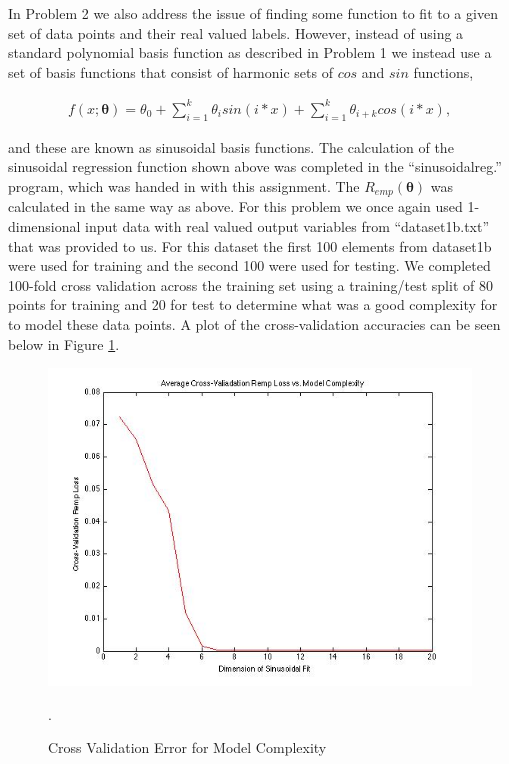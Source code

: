 \documentclass[paper=a4, fontsize=11pt]{scrartcl} %
\begin{document}
In Problem 2 we also address the issue of finding some function to fit to a given set of data points and their real valued labels.  However, instead of using a standard polynomial basis function as described in Problem 1 we instead use a set of basis functions that consist of harmonic sets of $cos$ and $sin$ functions, 

\begin{align}
f(x;\bm{\theta}) = \theta_{0} +\sum\limits_{i=1}^k \theta_{i}sin(i*x) + \sum\limits_{i=1}^k \theta_{i+k}cos(i*x),
\end{align}

and these are known as sinusoidal basis functions.
The calculation of the sinusoidal regression function shown above was completed in the  ``sinusoidalreg.'' program, which was handed in with this assignment.  
The $R_{emp}(\bm{\theta})$ was calculated in the same way as above.
For this problem we once again used 1-dimensional input data with real valued output variables from ``dataset1b.txt'' that was provided to us.
For this dataset the first 100 elements from dataset1b were used for training and the second 100 were used for testing.
We completed 100-fold cross validation across the training set using a training/test split of 80 points for training and 20 for test to determine what was a good complexity for to model these data points.
A plot of the cross-validation accuracies can be seen below in Figure \ref{fig:prob2_crossvalerrors}.

\begin{figure}
\centering
\includegraphics[scale=0.4]{Prob2_CrossValError.jpg}
\caption{Cross Validation Error for Model Complexity}
\label{fig:prob2_crossvalerrors}.
\end{figure}
\end{document}
